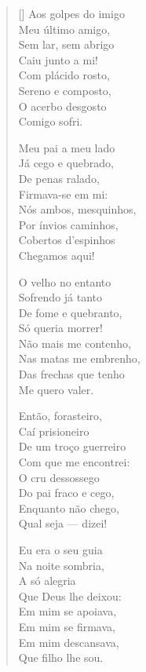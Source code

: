 \documentclass[12pt]{book}
\begin{document}
\begin{verse}[\versewidth]
						Aos golpes do imigo \\
						Meu último amigo, \\
						Sem lar, sem abrigo \\
						Caiu junto a mi! \\
						Com plácido rosto, \\
						Sereno e composto, \\
						O acerbo desgosto \\
						Comigo sofri.
						
						Meu pai a meu lado \\
						Já cego e quebrado, \\
						De penas ralado, \\
						Firmava-se em mi: \\
						Nós ambos, mesquinhos, \\
						Por ínvios caminhos, \\
						Cobertos d’espinhos \\
						Chegamos aqui!
						
						O velho no entanto \\
						Sofrendo já tanto \\
						De fome e quebranto, \\
						Só queria morrer! \\
						Não mais me contenho, \\
						Nas matas me embrenho, \\
						Das frechas que tenho \\
						Me quero valer.
						
						Então, forasteiro, \\
						Caí prisioneiro \\
						De um troço guerreiro \\
						Com que me encontrei: \\
						O cru dessossego \\
						Do pai fraco e cego, \\
						Enquanto não chego, \\
						Qual seja — dizei!
						
						Eu era o seu guia \\
						Na noite sombria, \\
						A só alegria \\
						Que Deus lhe deixou: \\
						Em mim se apoiava, \\
						Em mim se firmava, \\
						Em mim descansava, \\
						Que filho lhe sou.
						

\end{verse}
\end{document}
